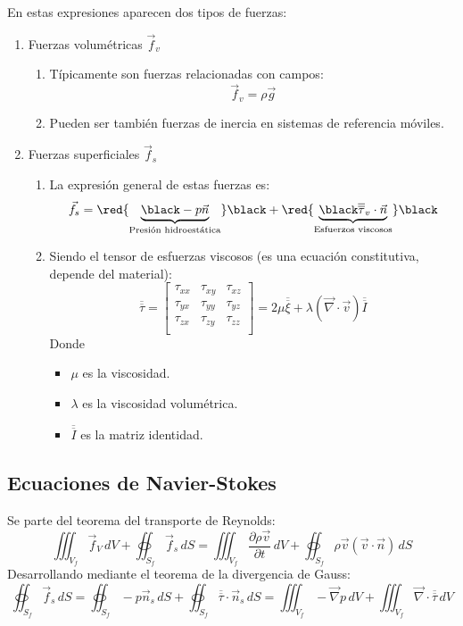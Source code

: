 En estas expresiones aparecen dos tipos de fuerzas:
\begin{enumerate}
	\item Fuerzas volumétricas $\vec{f}_v$
	\begin{enumerate}
		\item Típicamente son fuerzas relacionadas con campos:
		\[\vec{f}_v=\rho \vec{g}\]
		\item Pueden ser también fuerzas de inercia en sistemas de referencia móviles.
	\end{enumerate}
	\item Fuerzas superficiales $\vec{f}_s$
	
	\begin{enumerate}
		\item La expresión general de estas fuerzas es:
		\[\vec{f}_s=
		\red{\underbrace{\black -p\vec{n}}_{\text{Presión hidroestática}}}\black
		+
		\red{\underbrace{\black \overline{\overline{\tau}}_v\cdot\vec{n}}_{\text{Esfuerzos viscosos}}}\black
		\]
		\item Siendo el tensor de esfuerzas viscosos (es una ecuación constitutiva, depende del material):
		\[
		\overline{\overline{\tau}}=
		\begin{bmatrix}
			\tau_{xx} &\tau_{xy} & \tau_{xz} \\
			 \tau_{yx}&  \tau_{yy}& \tau_{yz}\\	
			\tau_{zx} & \tau_{zy} & \tau_{zz} \\
		\end{bmatrix}
		=2\mu \overline{\overline{\xi}} + \lambda \left(\vec{\nabla}\cdot \vec{v}\right)\overline{\overline{I}}
		\]
		Donde \begin{itemize}
			\item $\mu$ es la viscosidad.
			\item $\lambda$ es la viscosidad volumétrica.
			\item $\overline{\overline{I}}$ es la matriz identidad.
		\end{itemize}
	\end{enumerate}
\end{enumerate}
\subsection{Ecuaciones de Navier-Stokes}
Se parte del teorema del transporte de Reynolds:
\begin{equation}
\iiint_{V_f}\vec{f}_V\,dV
+
\oiint_{S_f}\vec{f}_s\,dS
=
\iiint_{V_f}\frac{\partial \rho\vec{v}}{\partial t}\,dV
+
\oiint_{S_f}\rho\vec{v}\left(\vec{v}\cdot\vec{n}\right)\,dS
\end{equation}
Desarrollando mediante el teorema de la divergencia de Gauss:
\begin{equation}
	\oiint_{S_f}\vec{f}_s\,dS
	=
	\oiint_{S_f}-p\vec{n}_s\,dS
	+
	\oiint_{S_f}\overline{\overline{\tau}}\cdot\vec{n}_s\,dS
	=
	\iiint_{V_f}-\vec{\nabla}p\,dV
	+
	\iiint_{V_f}\vec{\nabla}\cdot\overline{\overline{\tau}}\,dV
\end{equation}

